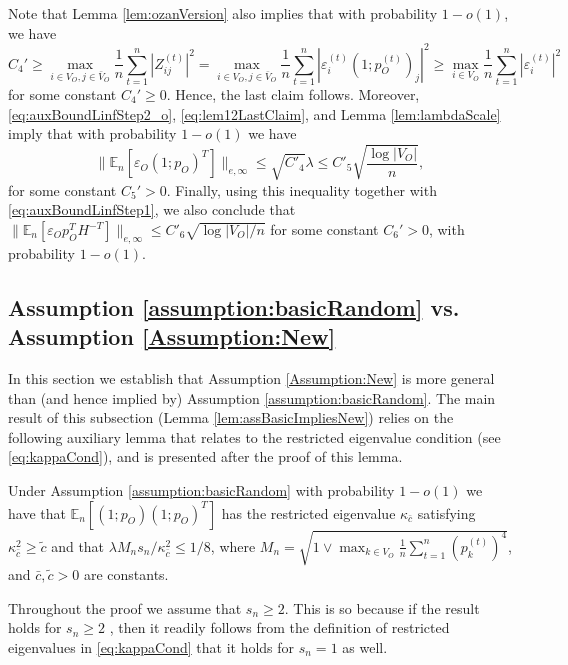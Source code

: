 \documentclass[opre,nonblindrev]{informs3} %
\def\En{{\mathbb{E}_n}}
\begin{document}
\begin{APPENDIX}{}
 	Note that	Lemma \ref{lem:ozanVersion} also implies  that with probability $1-o(1)$, we have
 	\begin{equation}\label{eq:lem12LastClaim}
 	C_4' \geq
 	\max_{i\in V_O,j\in{ \bar{V}}_O}
 	\frac{1}{n}\sum_{t=1}^n|Z^{(t)}_{ij}|^2 =
 	\max_{i\in V_O,j\in{ \bar{V}}_O}
 	\frac{1}{n}\sum_{t=1}^n|\varepsilon_i^{(t)} (1;p_O^{(t)})_j|^2
 	\geq
 	\max_{i\in V_O }
 	\frac{1}{n}\sum_{t=1}^n|\varepsilon_i^{(t)} |^2
 	\end{equation}
 	for some constant $C_4' \geq 0$. Hence, the last claim  follows.
 	Moreover, 
\eqref{eq:auxBoundLinfStep2_o},
 	\eqref{eq:lem12LastClaim}, and  
 	Lemma \ref{lem:lambdaScale} imply that with probability $1-o(1)$ we have
 	$$ \| \En[ \varepsilon_O (1;p_O)^T ]\|_{e,\infty} \leq \sqrt{C'_4} \lambda 
 	\leq C'_5 \sqrt{\frac{\log |V_O|}{n}},$$
 	for some constant $C_5'>0$.
Finally,
 	using this inequality together with
 	\eqref{eq:auxBoundLinfStep1}, we also conclude that
 	$ \| \En[ \varepsilon_O p_O^T H^{-T} ]\|_{e,\infty}  \leq C'_{6} \sqrt{\log |V_O|/n}$
 	for some constant $C_{6}'> 0$, with probability $1-o(1)$.
 	\hfill\halmos
 	\endproof
 	
 	
 	
 	

\subsection{Assumption \ref{assumption:basicRandom} vs. Assumption \ref{Assumption:New}}
\label{subse:Assumptions}

In this section we establish that Assumption \ref{Assumption:New} is more general than (and hence implied by) Assumption \ref{assumption:basicRandom}.
The main result of this subsection  (Lemma \ref{lem:assBasicImpliesNew})
relies on the  following auxiliary lemma that relates to the restricted
eigenvalue condition (see \eqref{eq:kappaCond}), and is presented after the proof of this lemma.
 

\begin{lemma}\label{lemma:auxBoundsRE}
	Under Assumption \ref{assumption:basicRandom}
	with probability $1-o(1)$ we have that
	$\En[(1;p_O) (1;p_O)^T]$ has the restricted eigenvalue $\kappa_{\bar c}$
	satisfying
	$\kappa^2_{\bar c} \geq \tilde{c}$
	and that
	$\lambda M_n s_n /\kappa^2_{\bar{c}} \leq  1/8$,
	where $M_n = \sqrt{ 1\vee \max_{k\in V_O}\frac{1}{n}\sum_{t=1}^n(p_k^{(t)})^4 }$, and $\bar{c},\tilde{c}>0$ are constants.
	
	
\end{lemma}
Throughout the proof we assume that $s_n\geq 2$. This is so because
if  the result holds for $s_n\geq 2$ , then it readily follows from 
the definition of restricted eigenvalues in
\eqref{eq:kappaCond} that it  holds for $s_n=1$ as well.


\end{APPENDIX}
\end{document}
